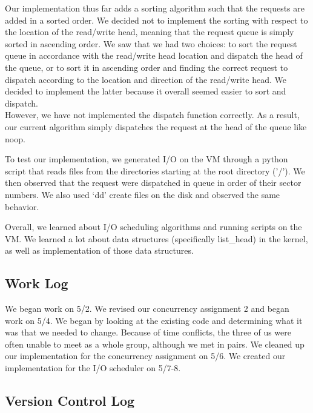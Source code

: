 \documentclass[journal, letterpaper, draftclsnofoot, onecolumn, 10pt]{IEEEtran}
\begin{document}


Our implementation thus far adds a sorting algorithm such that the requests are added in a sorted order. We decided not to implement
the sorting with respect to the location of the read/write head, meaning that the request queue is simply sorted in ascending order.
We saw that we had two choices: to sort the request queue in accordance with the read/write head location and dispatch the head of
the queue, or to sort it in ascending order and finding the correct request to dispatch according to the location and direction of
the read/write head. We decided to implement the latter because it overall seemed easier to sort and dispatch. \\

However, we have not implemented the dispatch function correctly. As a result, our current algorithm simply dispatches the request
at the head of the queue like noop.


To test our implementation, we generated I/O on the VM through a python script that reads files from the directories starting at the
root directory ('/'). We then observed that the request were dispatched in queue in order of their sector numbers. We also used `dd'
create files on the disk and observed the same behavior.



Overall, we learned about I/O scheduling algorithms and running scripts on the VM. We learned a lot about data structures
(specifically list\_head) in the kernel, as well as implementation of those data structures.\\

\subsection{Work Log}
We began work on 5/2. We revised our concurrency assignment 2 and began work on 5/4. We began by looking
at the existing code and determining what it was that we needed to change. Because of time conflicts, the three of us were often unable
to meet as a whole group, although we met in pairs. We cleaned up our implementation for the concurrency assignment on 5/6.
We created our implementation for the I/O scheduler on 5/7-8.

\clearpage
\subsection{Version Control Log}
\end{document}
